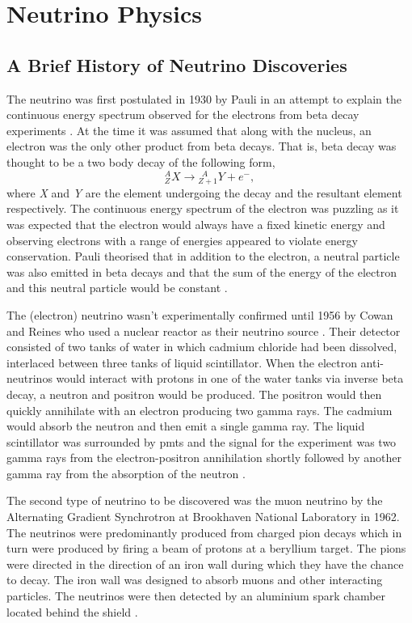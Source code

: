 \chapter{Neutrino Physics}
\label{chap:Neutrino Physics}
\section{A Brief History of Neutrino Discoveries}

The neutrino was first postulated in 1930 by Pauli in an attempt to explain the continuous energy spectrum observed for the electrons from beta decay experiments \cite{Pauli_letter}. At the time it was assumed that along with the nucleus, an electron was the only other product from beta decays. That is, beta decay was thought to be a two body decay of the following form,
\begin{equation}
    {^A_Z}X \longrightarrow {^{\ \ A}_{Z+1}}Y + e^-,
\end{equation}
where \textit{X} and \textit{Y} are the element undergoing the decay and the resultant element respectively. The continuous energy spectrum of the electron was puzzling as it was expected that the electron would always have a fixed kinetic energy and observing electrons with a range of energies appeared to violate energy conservation. Pauli theorised that in addition to the electron, a neutral particle was also emitted in beta decays and that the sum of the energy of the electron and this neutral particle would be constant \cite{Pauli_letter}.

The (electron) neutrino wasn't experimentally confirmed until 1956 by Cowan and Reines who used a nuclear reactor as their neutrino source \cite{cowan_and_reines_paper}. Their detector consisted of two tanks of water in which cadmium chloride had been dissolved, interlaced between three tanks of liquid scintillator. When the electron anti-neutrinos would interact with protons in one of the water tanks via inverse beta decay, a neutron and positron would be produced. The positron would then quickly annihilate with an electron producing two gamma rays. The cadmium would absorb the neutron and then emit a single gamma ray. The liquid scintillator was surrounded by \Glspl{pmt} and the signal for the experiment was two gamma rays from the electron-positron annihilation shortly followed by another gamma ray from the absorption of the neutron \cite{cowan_and_reines_paper}.

The second type of neutrino to be discovered was the muon neutrino by the Alternating Gradient Synchrotron at Brookhaven National Laboratory in 1962. The neutrinos were predominantly produced from charged pion decays which in turn were produced by firing a beam of protons at a beryllium target. The pions were directed in the direction of an iron wall during which they have the chance to decay. The iron wall was designed to absorb muons and other interacting particles. The neutrinos were then detected by an aluminium spark chamber located behind the shield \cite{Muon_neutrino_discovery}. 

